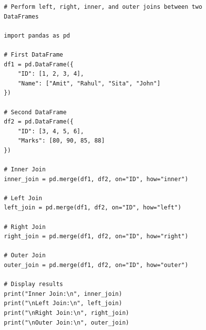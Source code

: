 \begin{verbatim}
# Perform left, right, inner, and outer joins between two 
DataFrames

import pandas as pd

# First DataFrame
df1 = pd.DataFrame({
    "ID": [1, 2, 3, 4],
    "Name": ["Amit", "Rahul", "Sita", "John"]
})

# Second DataFrame
df2 = pd.DataFrame({
    "ID": [3, 4, 5, 6],
    "Marks": [80, 90, 85, 88]
})

# Inner Join
inner_join = pd.merge(df1, df2, on="ID", how="inner")

# Left Join
left_join = pd.merge(df1, df2, on="ID", how="left")

# Right Join
right_join = pd.merge(df1, df2, on="ID", how="right")

# Outer Join
outer_join = pd.merge(df1, df2, on="ID", how="outer")

# Display results
print("Inner Join:\n", inner_join)
print("\nLeft Join:\n", left_join)
print("\nRight Join:\n", right_join)
print("\nOuter Join:\n", outer_join)
\end{verbatim}